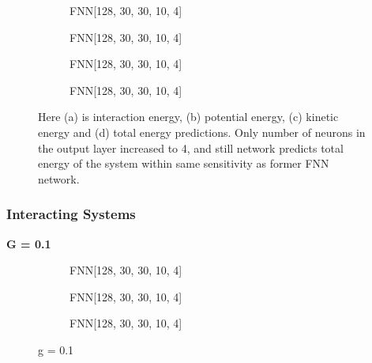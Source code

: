 \documentclass[a4paper,times,12pt]{article}
\begin{document}
\begin{figure}[H]
    \centering
    \begin{subfigure}[t]{0.45\textwidth}
		\centering
        
        \caption{FNN[128, 30, 30, 10, 4]}
		\label{fig:a}
    \end{subfigure}\hfill
    \begin{subfigure}[t]{0.45\textwidth}
		\centering
        
        \caption{FNN[128, 30, 30, 10, 4]}
		\label{fig:b}
    \end{subfigure}\hfill    
    \begin{subfigure}[t]{0.45\textwidth}
        \centering
        
        \caption{FNN[128, 30, 30, 10, 4]}
		\label{fig:c}
    \end{subfigure}\hfill
    \begin{subfigure}[t]{0.45\textwidth}
        \centering
        
        \caption{FNN[128, 30, 30, 10, 4]}
		\label{fig:c}
    \end{subfigure}
	\caption{Here (a) is interaction energy, (b) potential energy, (c) kinetic energy and (d) total energy predictions. Only number of neurons in the output layer increased to 4, and still network predicts total energy of the system within same sensitivity as former FNN network.}
\end{figure}

\subsubsection{Interacting Systems}

\textbf{G = 0.1}

\begin{figure}[H]
    \centering
    \begin{subfigure}[t]{0.45\textwidth}
		\centering
        
        \caption{FNN[128, 30, 30, 10, 4]}
		\label{fig:a}
    \end{subfigure}\hfill
    \begin{subfigure}[t]{0.45\textwidth}
		\centering
        
        \caption{FNN[128, 30, 30, 10, 4]}
		\label{fig:b}
    \end{subfigure}\hfill    
    \begin{subfigure}[t]{0.45\textwidth}
        \centering
        
        \caption{FNN[128, 30, 30, 10, 4]}
		\label{fig:c}
    \end{subfigure}
	\caption{g = 0.1}
\end{figure}
\end{document}
